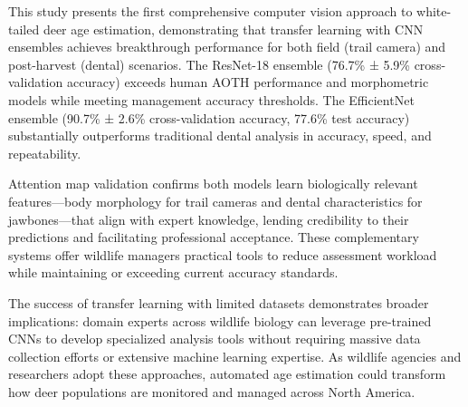 \documentclass{iopjournal}
\begin{document}
This study presents the first comprehensive computer vision approach to white-tailed deer age estimation, demonstrating that transfer learning with CNN ensembles achieves breakthrough performance for both field (trail camera) and post-harvest (dental) scenarios. The ResNet-18 ensemble (76.7\% ± 5.9\% cross-validation accuracy) exceeds human AOTH performance and morphometric models while meeting management accuracy thresholds. The EfficientNet ensemble (90.7\% ± 2.6\% cross-validation accuracy, 77.6\% test accuracy) substantially outperforms traditional dental analysis in accuracy, speed, and repeatability.

Attention map validation confirms both models learn biologically relevant features—body morphology for trail cameras and dental characteristics for jawbones—that align with expert knowledge, lending credibility to their predictions and facilitating professional acceptance. These complementary systems offer wildlife managers practical tools to reduce assessment workload while maintaining or exceeding current accuracy standards.

The success of transfer learning with limited datasets demonstrates broader implications: domain experts across wildlife biology can leverage pre-trained CNNs to develop specialized analysis tools without requiring massive data collection efforts or extensive machine learning expertise. As wildlife agencies and researchers adopt these approaches, automated age estimation could transform how deer populations are monitored and managed across North America.





\end{document}
